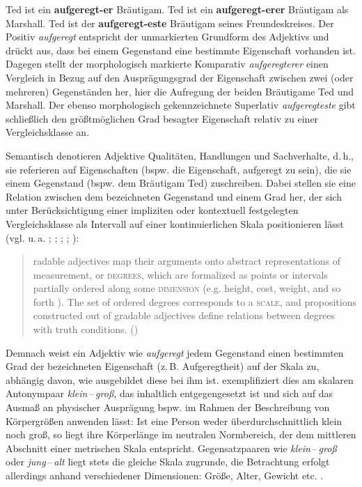 \ea   \label{teds}

\ea Ted ist ein \textbf{aufgeregt-er} Bräutigam. \label{ted4}
\ex Ted ist ein \textbf{aufgeregt-erer} Bräutigam als Marshall. \label{ted5}
\ex Ted ist der \textbf{aufgeregt-este} Bräutigam seines Freundeskreises. \label{ted6}
 \z
 \z
Der Positiv \textit{aufgeregt} entspricht der unmarkierten Grundform des Adjektivs und drückt aus, dass bei einem Gegenstand eine bestimmte Eigenschaft vorhanden ist. Dagegen stellt der morphologisch markierte Komparativ \textit{aufgeregterer} einen Vergleich in Bezug auf den Ausprägungsgrad der Eigenschaft zwischen zwei (oder mehreren) Gegenständen her, hier die Aufregung der beiden Bräutigame Ted und Marshall. Der ebenso morphologisch gekennzeichnete Superlativ \textit{aufgeregteste} gibt schließlich den größtmöglichen Grad besagter Eigenschaft relativ zu einer Vergleichsklasse an.

Semantisch denotieren Adjektive Qualitäten, Handlungen und Sachverhalte, d.\,h., sie referieren auf Eigenschaften (bspw. die Eigenschaft, aufgeregt zu sein), die sie einem Gegenstand (bspw. dem Bräutigam Ted) zuschreiben. {Dabei} stellen sie eine Relation zwischen dem bezeichneten Gegenstand und einem Grad her, der sich unter Berücksichtigung einer impliziten oder kontextuell festgelegten Vergleichsklasse als Intervall auf einer kontinuierlichen Skala positionieren lässt (vgl. u.\,a. \citealt[266]{Cresswell.1976}; \citealt[56]{Stechow.1984}; {\citealt[103]{Bierwisch.1987b}}; \citealt[5]{Kennedy.2007}; \citealt[1343ff.]{Rainer.2015}):

\begin{quotation}
\noindent [G]radable adjectives map their arguments onto abstract representations of measurement, or \textsc{degrees}, which are formalized as points or intervals partially ordered along some \textsc{dimension} (e.g. height, cost, weight, and so forth \textelp{}). The set of ordered degrees corresponds to a \textsc{scale}, and propositions constructed out of gradable adjectives define relations between degrees with truth conditions. \hfill (\citealt[349]{Kennedy.2005})
\end{quotation}
 

\noindent Demnach weist ein Adjektiv wie \textit{aufgeregt} jedem Gegenstand einen bestimmten Grad der bezeichneten Eigenschaft (z.\,B. Aufgeregtheit) auf der Skala zu, abhängig davon, wie ausgebildet diese bei ihm ist. \citet[57]{Os.1989} exemplifiziert dies am skalaren Antonympaar \textit{klein}\,--\,\textit{groß}, das inhaltlich entgegengesetzt ist und sich auf das Ausmaß an physischer Ausprägung bspw. im Rahmen der Beschreibung von Körpergrößen anwenden lässt: Ist eine Person weder überdurchschnittlich klein noch groß, so liegt ihre Körperlänge im neutralen Normbereich, der dem mittleren Abschnitt einer metrischen Skala entspricht. Gegensatzpaaren wie \textit{klein}\,--\,\textit{groß} oder \textit{jung}\,--\,\textit{alt} liegt stets die gleiche Skala zugrunde, die Betrachtung erfolgt allerdings anhand verschiedener Dimensionen: Größe, Alter, Gewicht etc. \citep[vgl.][33]{Kennedy.2007}. %


